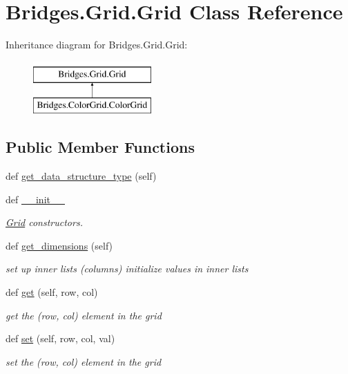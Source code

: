 \hypertarget{class_bridges_1_1_grid_1_1_grid}{}\section{Bridges.\+Grid.\+Grid Class Reference}
\label{class_bridges_1_1_grid_1_1_grid}
Inheritance diagram for Bridges.\+Grid.\+Grid\+:\begin{figure}[H]
\begin{center}
\leavevmode
\includegraphics[height=2.000000cm]{class_bridges_1_1_grid_1_1_grid}
\end{center}
\end{figure}
\subsection*{Public Member Functions}
\begin{DoxyCompactItemize}
\item 
def \hyperlink{class_bridges_1_1_grid_1_1_grid_ac3ee98a6b4b9c743f2116f7c855f3fd3}{get\+\_\+data\+\_\+structure\+\_\+type} (self)
\item 
def \hyperlink{class_bridges_1_1_grid_1_1_grid_af753514740b72172143221e708f30086}{\+\_\+\+\_\+init\+\_\+\+\_\+}
\begin{DoxyCompactList}\small\item\em \hyperlink{class_bridges_1_1_grid_1_1_grid}{Grid} constructors. \end{DoxyCompactList}\item 
def \hyperlink{class_bridges_1_1_grid_1_1_grid_af077067d396e080403231f5834dbdbb0}{get\+\_\+dimensions} (self)
\begin{DoxyCompactList}\small\item\em set up inner lists (columns) initialize values in inner lists \end{DoxyCompactList}\item 
def \hyperlink{class_bridges_1_1_grid_1_1_grid_ae4848ca073fcc0b8e657b2bd5cd5efa4}{get} (self, row, col)
\begin{DoxyCompactList}\small\item\em get the (row, col) element in the grid \end{DoxyCompactList}\item 
def \hyperlink{class_bridges_1_1_grid_1_1_grid_a85ead00286be2a6947637f2665dfe973}{set} (self, row, col, val)
\begin{DoxyCompactList}\small\item\em set the (row, col) element in the grid \end{DoxyCompactList}\end{DoxyCompactItemize}
